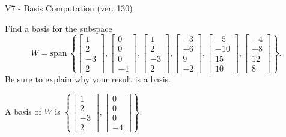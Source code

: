 \begin{exercise}
  \begin{exerciseTitle}V7 - Basis Computation (ver. 130)\end{exerciseTitle}
  \begin{exerciseStatement}
    Find a basis for the subspace 
\[W=\mathrm{span}\ \left\{\left[\begin{array}{r}
1 \\
2 \\
-3 \\
2
\end{array}\right] , \left[\begin{array}{r}
0 \\
0 \\
0 \\
-4
\end{array}\right] , \left[\begin{array}{r}
1 \\
2 \\
-3 \\
2
\end{array}\right] , \left[\begin{array}{r}
-3 \\
-6 \\
9 \\
-2
\end{array}\right] , \left[\begin{array}{r}
-5 \\
-10 \\
15 \\
10
\end{array}\right] , \left[\begin{array}{r}
-4 \\
-8 \\
12 \\
8
\end{array}\right]\right\}.\]
 Be sure to explain why your result is a basis.


  \end{exerciseStatement}
  \begin{exerciseAnswer}
   A basis of \(W\) is  \(\left\{\left[\begin{array}{r}
1 \\
2 \\
-3 \\
2
\end{array}\right] , \left[\begin{array}{r}
0 \\
0 \\
0 \\
-4
\end{array}\right]\right\}\).
  


  \end{exerciseAnswer}
\end{exercise}